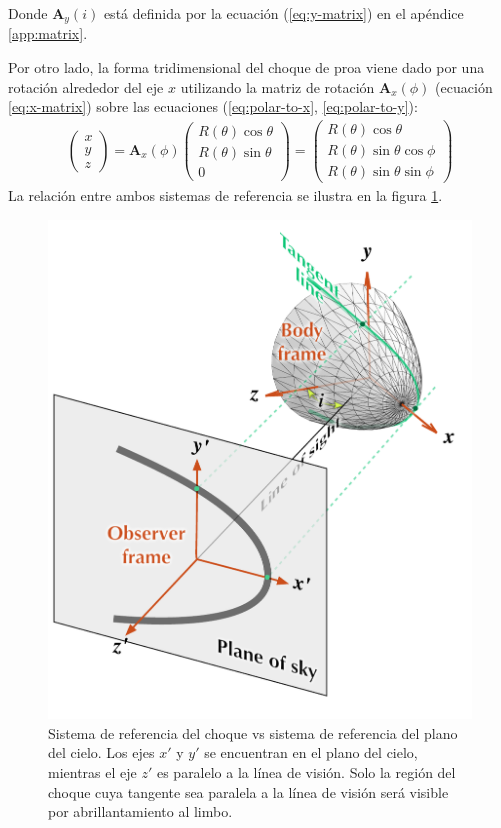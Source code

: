 Donde $\mathbf{A}_y(i)$ está definida por la ecuación (\ref{eq:y-matrix}) en el apéndice \ref{app:matrix}.

Por otro lado, la forma tridimensional del choque de proa viene dado por una rotación alrededor del eje $x$ utilizando la matriz de rotación $\mathbf{A}_x(\phi)$ (ecuación \ref{eq:x-matrix}) sobre las ecuaciones (\ref{eq:polar-to-x}, \ref{eq:polar-to-y}):
\begin{align}
  \left(
  \begin{array}{c}
    x \\ y \\ z
  \end{array}
  \right) = \mathbf{A}_x(\phi)\left(
  \begin{array}{c}
    R(\theta)\cos\theta \\ R(\theta)\sin\theta \\ 0
  \end{array}
  \right)
  = \left(
    \begin{array}{c}
      R(\theta)\cos\theta \\
      R(\theta)\sin\theta\cos\phi \\
      R(\theta)\sin\theta\sin\phi
    \end{array}
    \right)
\end{align}
La relación entre ambos sistemas de referencia se ilustra en la figura \ref{fig:reference}.
\begin{figure}
  \centering
  \includegraphics[width=0.5\linewidth]{./Figures/projection-pos}
  \caption[Sistema de referencia del choque vs sistema de referencia del plano del cielo]{Sistema de referencia del choque vs sistema de referencia del plano del cielo. Los ejes $x'$ y $y'$ se encuentran en el plano del cielo, mientras el eje $z'$ es paralelo a la línea de visión. Solo la región del choque cuya tangente sea paralela a la línea de visión será visible por abrillantamiento al limbo.}
  \label{fig:reference}
\end{figure}

